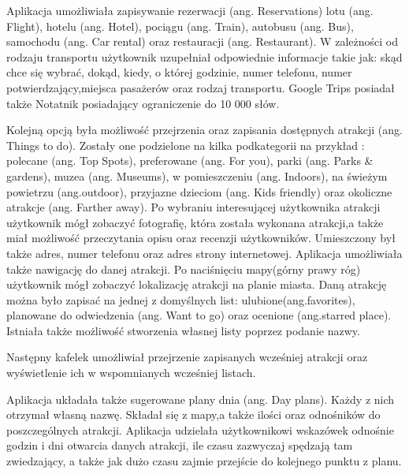 \documentclass[10pt,twoside,a4paper]{report}
\begin{document}
\par Aplikacja umożliwiała zapisywanie rezerwacji (ang. Reservations) lotu (ang. Flight), hotelu (ang. Hotel), pociągu (ang. Train), autobusu (ang. Bus), samochodu (ang. Car rental) oraz restauracji (ang. Restaurant). W zależności od rodzaju transportu użytkownik uzupełniał odpowiednie informacje takie jak: skąd chce się wybrać, dokąd, kiedy, o której godzinie, numer telefonu, numer potwierdzający,miejsca pasażerów oraz rodzaj transportu. Google Trips posiadał także Notatnik posiadający ograniczenie do 10 000 słów.
\par Kolejną opcją była możliwość przejrzenia oraz zapisania dostępnych atrakcji (ang. Things to do). Zostały one podzielone na kilka podkategorii na przykład : polecane (ang. Top Spots), preferowane (ang. For you), parki (ang. Parks \& gardens), muzea (ang. Museums), w pomieszczeniu (ang. Indoors), na świeżym powietrzu (ang.outdoor), przyjazne dzieciom (ang. Kids friendly) oraz okoliczne atrakcje (ang. Farther away). Po wybraniu interesującej użytkownika atrakcji użytkownik mógł zobaczyć fotografię, która została wykonana atrakcji,a także miał możliwość przeczytania opisu oraz recenzji użytkowników. Umieszczony był także adres, numer telefonu oraz adres strony internetowej. Aplikacja umożliwiała także nawigację do danej atrakcji. Po naciśnięciu mapy(górny prawy róg) użytkownik mógł zobaczyć lokalizację atrakcji na planie miasta. Daną atrakcję można było zapisać na jednej z domyślnych list: ulubione(ang.favorites), planowane do odwiedzenia (ang. Want to go) oraz ocenione (ang.starred place). Istniała także możliwość stworzenia własnej listy poprzez podanie nazwy.

\par Następny kafelek umożliwiał przejrzenie zapisanych wcześniej atrakcji oraz wyświetlenie ich w wspomnianych wcześniej listach.

\par Aplikacja układała także sugerowane plany dnia (ang. Day plans). Każdy z nich otrzymał własną nazwę. Składał się z mapy,a także ilości oraz odnośników do poszczególnych atrakcji. Aplikacja udzielała użytkownikowi wskazówek odnośnie godzin i dni otwarcia danych atrakcji, ile czasu zazwyczaj spędzają tam zwiedzający, a także jak dużo czasu zajmie przejście do kolejnego punktu z planu.
\end{document}
